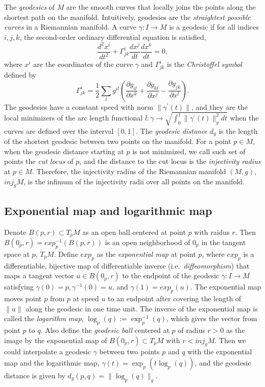 \documentclass[11pt,a4paper,]{article}
\begin{document}
The \emph{geodesics} of \(M\) are the smooth curves that locally joins the points along the shortest path on the manifold. Intuitively, geodesics are the \emph{straightest possible curves} in a Riemannian manifold. \autocite[Section 7.2.3 of][]{Nakahara2018-zs}
A curve \(\gamma: I \rightarrow M\) is a geodesic if for all indices \(i,j,k\), the second-order ordinary differential equation is satisfied,
\[
\frac{d^2 x^i}{dt^2} + \Gamma^i_{jk} \frac{d x^j}{dt} \frac{dx^k}{dt} = 0,
\]
where \({x^i}\) are the coordinates of the curve \(\gamma\) and \(\Gamma^i_{jk}\) is the \emph{Christoffel symbol} defined by
\[
\Gamma^i_{jk} = \frac{1}{2} \sum_l g^{il} (\frac{\partial g_{il}}{\partial x^k} 
+ \frac{\partial g_{kl}}{\partial x^j} - \frac{\partial g_{jk}}{\partial x^l}).
\]
The geodesics have a constant speed with norm \(\| \gamma^\prime(t) \|\), and they are the local minimizers of the arc
length functional \(l:\gamma \rightarrow \sqrt{\int_0^1 \| \gamma^\prime(t) \|_g^2 dt}\) when the curves are defined over the interval \([0,1]\).
The \emph{geodesic distance} \(d_g\) is the length of the shortest geodesic between two points on the manifold. For a point \(p \in M\), when the geodesic distance starting at \(p\) is not minimized, we call such set of points the \emph{cut locus} of \(p\), and the distance to the cut locus is the \emph{injectivity radius} at \(p \in M\). Therefore, the injectivity radius of the Riemannian manifold \((M,g)\), \(\textit{inj}_gM\), is the infimum of the injectivity radii over all points on the manifold.

\hypertarget{exponential-map-and-logarithmic-map}{%
\subsection{Exponential map and logarithmic map}\label{exponential-map-and-logarithmic-map}}

Denote \(B(p, r) \subset T_pM\) as an open ball centered at point \(p\) with raidus \(r\). Then \(B(0_p, r) = exp_p^{-1}(B(p,r))\) is an open neighborhood of \(0_p\) in the tangent space at \(p\), \(T_pM\). Define \(exp_p\) as the \emph{exponential map} at point \(p\), where \(exp_p\) is a differentiable, bijective map of differentiable inverse (i.e.~\emph{diffeomorphism}) that maps a tangent vector \(u \in B(0_p, r)\) to the endpoint of the geodesic \(\gamma: I \rightarrow M\) satisfying \(\gamma(0)=p, \gamma^{-1}(0)=u\), and \(\gamma(1)=exp_p(u)\). The exponential map moves point \(p\) from \(p\) at speed \(u\) to an endpoint after covering the length of \(\|u\|\) along the geodesic in one time unit. The inverse of the exponential map is called the \emph{logarithm map}, \(\log_p(q):= \exp^{-1}_p(q)\), which gives the vector from point \(p\) to \(q\). Also define the \emph{geodesic ball} centered at \(p\) of radius \(r > 0\) as the image by the exponential map of \(B(0_p, r) \subset T_pM\) with \(r < \textit{inj}_gM\). Then we could interpolate a geodesic \(\gamma\) between two points \(p\) and \(q\) with the exponential map and the logarithmic map, \(\gamma(t) = \exp_p(t\log_p(q))\), and the geodesic distance is given by \(d_g(p,q) = \|\log_p(q)\|_g\).
\end{document}
